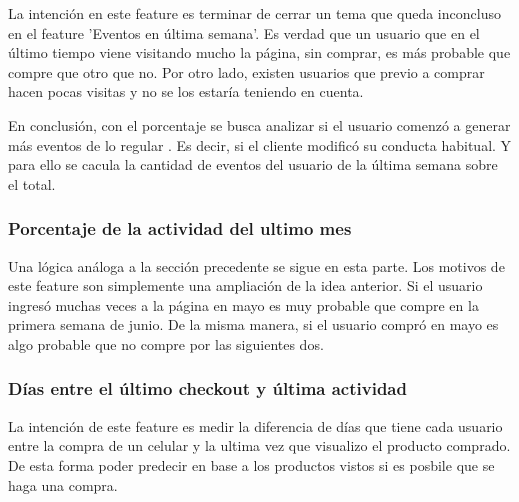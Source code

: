 \documentclass[a4paper]{article}
\begin{document}
\begin{sloppypar}
	\texttt{}
\end{sloppypar}

La intención en este feature es terminar de cerrar un tema que queda inconcluso en el feature 'Eventos en última semana'. Es verdad que un usuario que en el último tiempo viene visitando mucho la página, sin comprar, es más probable que compre que otro que no. Por otro lado, existen usuarios que previo a comprar hacen pocas visitas y no se los estaría teniendo en cuenta. 

En conclusión, con el porcentaje se busca analizar si el usuario comenzó a generar más eventos de lo regular . Es decir, si el cliente modificó su conducta habitual. Y para ello se cacula la cantidad de eventos del usuario de la última semana sobre el total.

\subsubsection{Porcentaje de la actividad del ultimo mes}

\begin{sloppypar}
	\texttt{}
\end{sloppypar}

Una lógica análoga a la sección precedente se sigue en esta parte. Los motivos de este feature son simplemente una ampliación de la idea anterior. Si el usuario ingresó muchas veces a la página en mayo es muy probable que compre en la primera semana de junio. De la misma manera, si el usuario compró en mayo es algo probable que no compre por las siguientes dos.

\subsubsection{Días entre el último checkout y última actividad}

\begin{sloppypar}
	\texttt{}
\end{sloppypar}

La intención de este feature es medir la diferencia de días que tiene cada usuario entre la compra de un celular y la ultima vez que visualizo el producto comprado. De esta forma poder predecir en base a los productos vistos si es posbile que se haga una compra.
\end{document}

